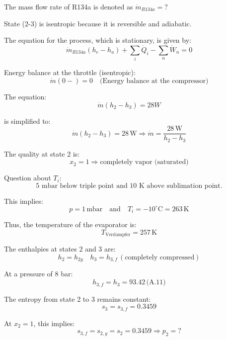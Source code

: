 The mass flow rate of R134a is denoted as \(\dot{m}_{R134a} = ?\)

State (2-3) is isentropic because it is reversible and adiabatic.

The equation for the process, which is stationary, is given by:
\[
\dot{m}_{R134a} (h_e - h_a) + \sum_i \dot{Q}_i - \sum_n \dot{W}_n = 0
\]

Energy balance at the throttle (isentropic):
\[
\dot{m}(0-) = 0 \quad \text{(Energy balance at the compressor)}
\]

The equation:
\[
\dot{m}(h_2 - h_3) = 28W
\]

is simplified to:
\[
\dot{m} (h_2 - h_3) = 28 \, \text{W} \Rightarrow \dot{m} = \frac{28 \, \text{W}}{h_2 - h_3}
\]

The quality at state 2 is:
\[
x_2 = 1 \Rightarrow \text{completely vapor (saturated)}
\]

Question about \( T_i \):
\[
\text{5 mbar below triple point and 10 K above sublimation point.}
\]

This implies:
\[
p = 1 \, \text{mbar} \quad \text{and} \quad T_i = -10^\circ \text{C} = 263 \, \text{K}
\]

Thus, the temperature of the evaporator is:
\[
T_{\text{Verdampfer}} = 257 \, \text{K}
\]

The enthalpies at states 2 and 3 are:
\[
h_2 = h_{2g} \quad h_3 = h_{3,f} \, (\text{completely compressed})
\]

At a pressure of 8 bar:
\[
h_{3,f} = h_3 = 93.42 \, \text{(A.11)}
\]

The entropy from state 2 to 3 remains constant:
\[
s_3 = s_{3,f} = 0.3459
\]

At \( x_2 = 1 \), this implies:
\[
s_{3,f} = s_{2,g} = s_2 = 0.3459 \Rightarrow p_2 = ?
\]